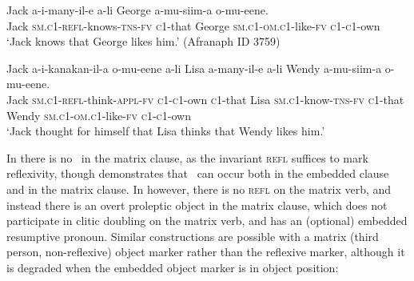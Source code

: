 \documentclass[output=paper,colorlinks,citecolor=brown]{langscibook}
\begin{document}
\ea%
    \label{ex:newkirk:14}
    \gll    Jack a-\alert{i}-many-il-e a-li George a-mu-siim-a \alert{o-mu-eene}.\\
		    Jack \textsc{sm.c1-refl-}knows\textsc{-tns-fv} \textsc{c1-}that George \textsc{sm.c1-om.c1-}like\textsc{-fv} \textsc{c1-c1-}own\\
	\glt    `Jack knows that George likes him.' 
	        \hfill (Afranaph ID 3759)
\z

\ea%
    \label{ex:newkirk:15}
    \gll    Jack a-\alert{i}-kanakan-il-a \alert{o-mu-eene} a-li Lisa a-many-il-e a-li Wendy a-mu-siim-a \alert{o-mu-eene}. \\
			Jack \textsc{sm.c1-refl-}think\textsc{-appl-fv} \textsc{c1-c1-}own \textsc{c1-}that Lisa \textsc{sm.c1-}know\textsc{-tns-fv} \textsc{c1-}that Wendy \textsc{sm.c1-om.c1-}like\textsc{-fv} \textsc{c1-c1-}own \\
	\glt    `Jack thought for himself that Lisa thinks that Wendy likes him.'
\z

In  there is no \agre\ in the matrix clause, as the invariant \textsc{refl} suffices to mark reflexivity, though  demonstrates that \agre\ can occur both in the embedded clause and in the matrix clause. In  however, there is no \textsc{refl} on the matrix verb, and instead there is an overt proleptic object in the matrix clause, which does not participate in clitic doubling on the matrix verb, and has an (optional) embedded resumptive pronoun. Similar constructions are possible with a matrix (third person, non-reflexive) object marker rather than the reflexive marker, although it is degraded when the embedded object marker is in object position:

\z

\z
\end{document}
